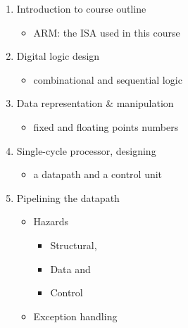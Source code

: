 \begin{frame}[fragile]
\begin{enumerate}
	\item {\small Introduction to course outline}
 \begin{itemize}
     \item {\footnotesize ARM: the ISA used in this course}
 \end{itemize}
 \item {\small Digital logic design }
 \begin{itemize}
  \item {\footnotesize combinational and sequential logic}
\end{itemize}
	\item {\small Data representation \& manipulation}
 \begin{itemize}
  \item {\footnotesize fixed and floating points numbers}
 \end{itemize}
 \item {\small Single-cycle processor, designing}
  \begin{itemize}
  \item {\footnotesize a datapath and a control unit}
 \end{itemize}
 \item {\small Pipelining the datapath}
 \begin{itemize}
 \item {\small Hazards}
 \begin{itemize}
     \item {\footnotesize Structural,}
     \item {\footnotesize Data and }
     \item {\footnotesize Control}
 \end{itemize}
     \item {\footnotesize Exception handling}
 \end{itemize}

\end{enumerate}
\end{frame}
